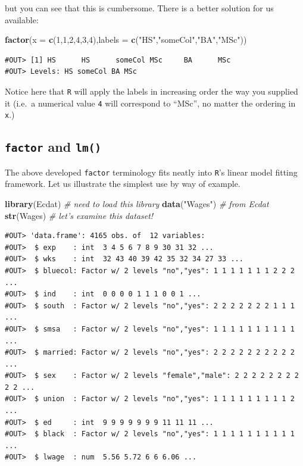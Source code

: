 \documentclass[]{book}
\newenvironment{Shaded}{\begin{snugshade}}{\end{snugshade}}
\newcommand{\KeywordTok}[1]{\textcolor[rgb]{0.13,0.29,0.53}{\textbf{#1}}}
\newcommand{\DataTypeTok}[1]{\textcolor[rgb]{0.13,0.29,0.53}{#1}}
\newcommand{\DecValTok}[1]{\textcolor[rgb]{0.00,0.00,0.81}{#1}}
\newcommand{\StringTok}[1]{\textcolor[rgb]{0.31,0.60,0.02}{#1}}
\newcommand{\CommentTok}[1]{\textcolor[rgb]{0.56,0.35,0.01}{\textit{#1}}}
\newcommand{\NormalTok}[1]{#1}
\theoremstyle{definition}
\theoremstyle{definition}
\theoremstyle{definition}
\theoremstyle{remark}
\begin{document}
but you can see that this is cumbersome. There is a better solution for
us available:

\begin{Shaded}
\begin{Highlighting}[]
\KeywordTok{factor}\NormalTok{(}\DataTypeTok{x =} \KeywordTok{c}\NormalTok{(}\DecValTok{1}\NormalTok{,}\DecValTok{1}\NormalTok{,}\DecValTok{2}\NormalTok{,}\DecValTok{4}\NormalTok{,}\DecValTok{3}\NormalTok{,}\DecValTok{4}\NormalTok{),}\DataTypeTok{labels =} \KeywordTok{c}\NormalTok{(}\StringTok{"HS"}\NormalTok{,}\StringTok{"someCol"}\NormalTok{,}\StringTok{"BA"}\NormalTok{,}\StringTok{"MSc"}\NormalTok{))}
\end{Highlighting}
\end{Shaded}

\begin{verbatim}
#OUT> [1] HS      HS      someCol MSc     BA      MSc    
#OUT> Levels: HS someCol BA MSc
\end{verbatim}

Notice here that \texttt{R} will apply the labels in increasing order
the way you supplied it (i.e.~a numerical value \texttt{4} will
correspond to ``MSc'', no matter the ordering in \texttt{x}.)

\subsection{\texorpdfstring{\texttt{factor} and
\texttt{lm()}}{factor and lm()}}\label{factor-and-lm}

The above developed \texttt{factor} terminology fits neatly into
\texttt{R}'s linear model fitting framework. Let us illustrate the
simplest use by way of example.

\begin{Shaded}
\begin{Highlighting}[]
\KeywordTok{library}\NormalTok{(Ecdat)  }\CommentTok{# need to load this library}
\KeywordTok{data}\NormalTok{(}\StringTok{"Wages"}\NormalTok{)   }\CommentTok{# from Ecdat}
\KeywordTok{str}\NormalTok{(Wages)   }\CommentTok{# let's examine this dataset!}
\end{Highlighting}
\end{Shaded}

\begin{verbatim}
#OUT> 'data.frame': 4165 obs. of  12 variables:
#OUT>  $ exp    : int  3 4 5 6 7 8 9 30 31 32 ...
#OUT>  $ wks    : int  32 43 40 39 42 35 32 34 27 33 ...
#OUT>  $ bluecol: Factor w/ 2 levels "no","yes": 1 1 1 1 1 1 1 2 2 2 ...
#OUT>  $ ind    : int  0 0 0 0 1 1 1 0 0 1 ...
#OUT>  $ south  : Factor w/ 2 levels "no","yes": 2 2 2 2 2 2 2 1 1 1 ...
#OUT>  $ smsa   : Factor w/ 2 levels "no","yes": 1 1 1 1 1 1 1 1 1 1 ...
#OUT>  $ married: Factor w/ 2 levels "no","yes": 2 2 2 2 2 2 2 2 2 2 ...
#OUT>  $ sex    : Factor w/ 2 levels "female","male": 2 2 2 2 2 2 2 2 2 2 ...
#OUT>  $ union  : Factor w/ 2 levels "no","yes": 1 1 1 1 1 1 1 1 1 2 ...
#OUT>  $ ed     : int  9 9 9 9 9 9 9 11 11 11 ...
#OUT>  $ black  : Factor w/ 2 levels "no","yes": 1 1 1 1 1 1 1 1 1 1 ...
#OUT>  $ lwage  : num  5.56 5.72 6 6 6.06 ...
\end{verbatim}
\end{document}
